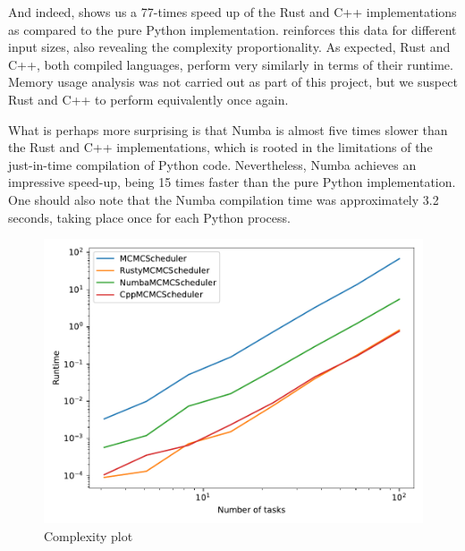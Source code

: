 And indeed,  shows us a 77-times speed up of the Rust and C++ implementations as compared to the pure Python implementation.
 reinforces this data for different input sizes, also revealing the complexity proportionality.
As expected, Rust and C++, both compiled languages, perform very similarly in terms of their runtime.
Memory usage analysis was not carried out as part of this project, but we suspect Rust and C++ to perform equivalently once again.

What is perhaps more surprising is that Numba is almost five times slower than the Rust and C++ implementations, which is rooted in the limitations of the just-in-time compilation of Python code.
Nevertheless, Numba achieves an impressive speed-up, being 15 times faster than the pure Python implementation.
One should also note that the Numba compilation time was approximately 3.2 seconds, taking place once for each Python process.

\begin{figure}[H]
  \centering
  \includegraphics[width=0.7\linewidth]{results/complexity.pdf}
  \caption{Complexity plot}
  \label{fig:complexity}
\end{figure}

